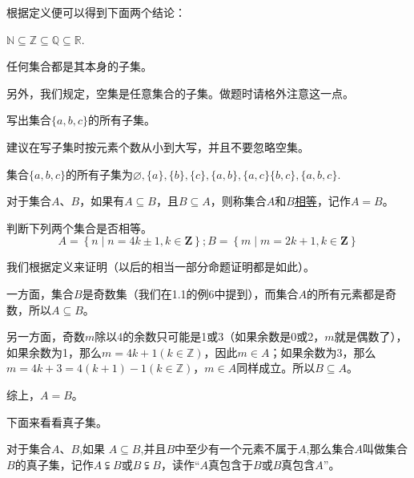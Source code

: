 \documentclass[lang=cn,math=cm,chinesefont=nofont,11pt,scheme=chinese]{elegantbook}
\begin{document}
根据定义便可以得到下面两个结论：

\begin{conclusion}
  $\mathbb{N}\subseteq\mathbb{Z}\subseteq\mathbb{Q}\subseteq\mathbb{R}$.
\end{conclusion}
\begin{conclusion}
  任何集合都是其本身的子集。
\end{conclusion}

另外，我们规定，空集是任意集合的子集。做题时请格外注意这一点。

\begin{example}
  写出集合$\{a,b,c\}$的所有子集。
\end{example}
\begin{remark}
  建议在写子集时按元素个数从小到大写，并且不要忽略空集。
\end{remark}
\begin{solution}
  集合$\{a,b,c\}$的所有子集为$\varnothing ,\{a\},\{b\},\{c\},\{a,b\},\{a,c\}\{b,c\},\{a,b,c\}$.
\end{solution}
\begin{definition}[集合的相等]
  对于集合$A$、$B$，如果有$A\subseteq B$，且$B\subseteq A$，则称集合$A$和$B$\underline{相等}，记作$A=B$。
\end{definition}

\begin{example}判断下列两个集合是否相等。
  $$A=\left\{n\mid n=4k\pm1,k\in\mathbf{Z}\right\};B=\left\{m\mid m=2k+1,k\in\mathbf{Z}\right\}$$
\end{example}
\begin{solution}
  我们根据定义来证明（以后的相当一部分命题证明都是如此）。

一方面，集合$B$是奇数集（我们在1.1的例6中提到），而集合$A$的所有元素都是奇数，所以$A\subseteq B$。

另一方面，奇数$m$除以4的余数只可能是1或3（如果余数是0或2，$m$就是偶数了），如果余数为1，那么$m=4k+1(k\in\mathbb{Z})$，因此$m\in A$；如果余数为3，那么$m=4k+3=4(k+1)-1(k\in\mathbb{Z})$，$m\in A$同样成立。所以$B\subseteq A$。

综上，$A=B$。
\end{solution}

下面来看看真子集。
\begin{definition}[真子集]
  对于集合$A$、$B$,如果 $A\subseteq B$,并且$B$中至少有一个元素不属于$A$,那么集合$A$叫做集合$B$的真子集，记作$A\subsetneqq B$或$B\subsetneqq B$，读作“$A$真包含于$B$或$B$真包含$A$”。
\end{definition}
\end{document}
